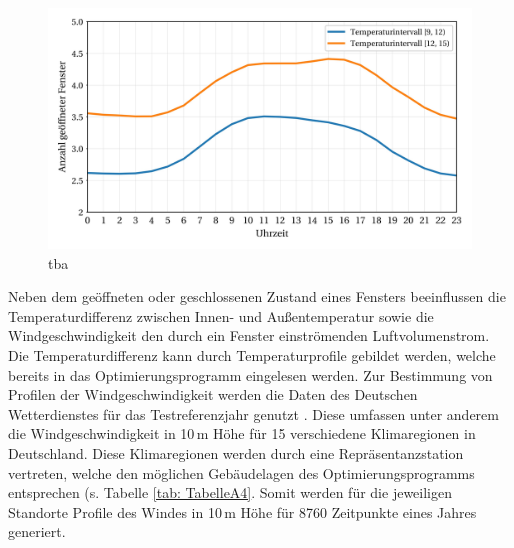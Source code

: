 \begin{figure}[H]
	\centering
		\includegraphics{Pictures/Fensteroeffnungsprofile.jpg}
	\caption{tba}
	\label{fig: Abbildung421} 
\end{figure}

Neben dem geöffneten oder geschlossenen Zustand eines Fensters beeinflussen die Temperaturdifferenz zwischen Innen- und Außentemperatur sowie die Windgeschwindigkeit den durch ein Fenster einströmenden Luftvolumenstrom.
Die Temperaturdifferenz kann durch Temperaturprofile gebildet werden, welche bereits in das Optimierungsprogramm eingelesen werden.
Zur Bestimmung von Profilen der Windgeschwindigkeit werden die Daten des Deutschen Wetterdienstes für das Testreferenzjahr genutzt \cite{try}.
Diese umfassen unter anderem die Windgeschwindigkeit in 10\,m Höhe für 15 verschiedene Klimaregionen in Deutschland.
Diese Klimaregionen werden durch eine Repräsentanzstation vertreten, welche den möglichen Gebäudelagen des Optimierungsprogramms entsprechen (s. Tabelle \ref{tab: TabelleA4}.
Somit werden für die jeweiligen Standorte Profile des Windes in 10\,m Höhe für 8760 Zeitpunkte eines Jahres generiert.









